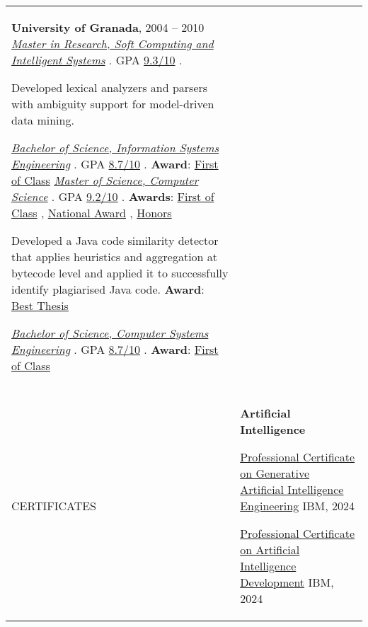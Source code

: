 \documentclass[letterpaper,10pt,oneside]{article}
\newcommand{\DatestampY}[1]{#1}
\newcommand{\itemspacingtwo}{\vspace{0.08cm}}
\newcommand{\sref}[2]{%
    \href{https://0/local/attachments/#1}{\textcolor{hiddenblue}{#2}}%
}
\newenvironment{body}
{\par\par
\begin{longtable}{p{0.145\textwidth}p{0.81\textwidth}}}
{\par\end{longtable}\par}
\renewcommand{\section}[3]{\\[-0.2cm]\pdfbookmark[2]{#2}{#3}\\%
\raggedleft  %
{\fontsize{9.5pt}{9.5pt}\selectfont\bfseries\raggedright%
\MakeUppercase{#1}}&}
\begin{document}
\begin{body}
\textbf{University of Granada}, \DatestampY{2004} -- \DatestampY{2010} \newline
\phantom{g}\textit{\sref{MRes-SoftComputingArtificialIntelligence-Diploma.pdf}{Master in Research, Soft Computing and Intelligent Systems}}. GPA \sref{MRes-SoftComputingArtificialIntelligence-Transcript-Spanish.pdf}{9.3/10}.
\begin{comp}
\item Developed lexical analyzers and parsers with ambiguity support for model-driven data mining.
\end{comp}
\phantom{g}\textit{\sref{BSc-ManagementInformationTechnology-Diploma.pdf}{Bachelor of Science, Information Systems Engineering}}. GPA \sref{BSc-ManagementInformationTechnology-Transcript.pdf}{8.7/10}. \textbf{Award}: \sref{BSc-ManagementInformationTechnology-Award-FirstOfPromotion.pdf}{First of Class}\newline
\phantom{g}\textit{\sref{MSc-ComputerEngineering-Diploma.pdf}{Master of Science, Computer Science}}. GPA \sref{MSc-ComputerEngineering-Transcript.pdf}{9.2/10}. \textbf{Awards}: \sref{MSc-ComputerEngineering-Award-FirstOfPromotion.pdf}{First of Class}, \sref{MSc-ComputerEngineering-Award-NationalAward.pdf}{National Award}, \sref{MSc-ComputerEngineering-Award-Distinction.pdf}{Honors}
\begin{comp}
\item Developed a Java code similarity detector that applies heuristics and aggregation at bytecode level and applied it to successfully identify plagiarised Java code. \textbf{Award}: \sref{MSc-ComputerEngineering-Award-BestMasterThesis.pdf}{Best Thesis}
\end{comp}
\phantom{g}\textit{\sref{BSc-SystemInformationTechnology-Diploma.pdf}{Bachelor of Science, Computer Systems Engineering}}. GPA \sref{BSc-SystemInformationTechnology-Transcript.pdf}{8.7/10}. \textbf{Award}: \sref{BSc-SystemInformationTechnology-Award-FirstOfPromotion.pdf}{First of Class}

\section{Certificates}{Certificates}{PDF:Certificates}
\textbf{Artificial Intelligence}
\begin{comp}
\item \sref{Certificate-Coursera-IBM-GenerativeAIEngineering.pdf}{Professional Certificate on Generative Artificial Intelligence Engineering} \textemdash{ }IBM, \DatestampY{2024}
\item \sref{Certificate-Coursera-IBM-AIDeveloper.pdf}{Professional Certificate on Artificial Intelligence Development} \textemdash{ }IBM, \DatestampY{2024}
\end{comp}
\itemspacingtwo


\end{body}
\end{document}
